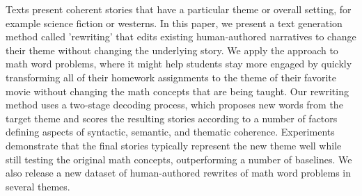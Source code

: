 Texts present coherent stories that have a particular theme or overall setting, for example science fiction or westerns. In this paper, we present a text generation method called 'rewriting' that edits existing human-authored narratives to change their theme without changing the underlying story. We apply the approach to math word problems, where it might help students stay more engaged by quickly transforming all of their homework assignments to the theme of their favorite movie without changing the math concepts that are being taught. Our rewriting method uses a two-stage decoding process, which proposes new words from the target theme and scores the resulting stories according to a number of factors defining aspects of syntactic, semantic, and thematic coherence. Experiments demonstrate that the final stories typically represent the new theme well while still testing the original math concepts, outperforming a number of baselines. We also release a new dataset of human-authored rewrites of math word problems in several themes.
